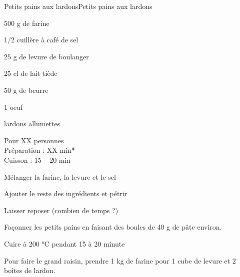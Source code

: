 \begin{recette}{Petits pains aux lardons}{Petits pains aux lardons}

\begin{ingredients}
500 g de farine\par
1/2 cuillère à café de sel\par
25 g de levure de boulanger\par
25 cl de lait tiède\par
50 g de beurre\par
1 oeuf\par
lardons allumettes\par
\end{ingredients}

\begin{infos}
Pour XX personnes\\
Préparation : XX min*	\\
Cuisson : 15 -- 20 min\\
\end{infos}

\begin{etapes}
\item Mélanger la farine, la levure et le sel
\item Ajouter le reste des ingrédients et pétrir
\item Laisser reposer (combien de temps ?)
\item Façonner les petits pains en faisant des boules de 40 g de pâte environ.
\item Cuire à 200 °C pendant 15 à 20 minute
\end{etapes}

\begin{conseils}
Pour faire le grand raisin, prendre 1 kg de farine pour 1 cube de levure et 2 boîtes de lardon.
\end{conseils}

\end{recette}